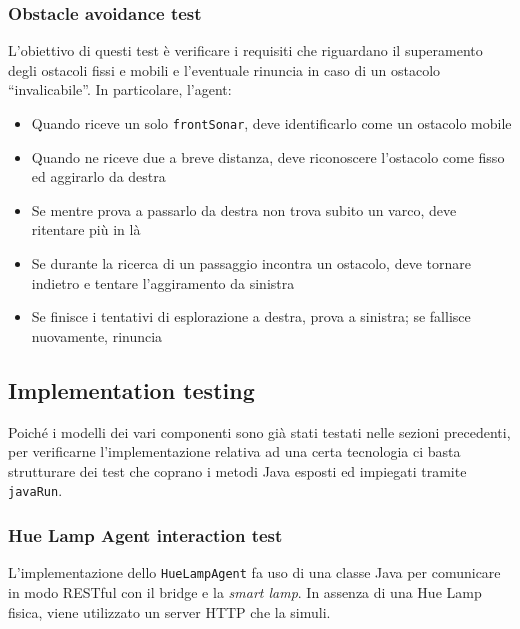 \documentclass{../llncs}
\newcommand{\codescript}[1]{{\mbox{\small{\texttt{#1}}}}\xspace}
\begin{document}
\subsubsection{Obstacle avoidance test}
L'obiettivo di questi test è verificare i requisiti che riguardano il superamento degli ostacoli fissi e mobili e l'eventuale rinuncia in caso di un ostacolo ``invalicabile''. In particolare, l'agent:
\begin{itemize}
\item Quando riceve un solo \codescript{frontSonar}, deve identificarlo come un ostacolo mobile
\item Quando ne riceve due a breve distanza, deve riconoscere l'ostacolo come fisso ed aggirarlo da destra
\item Se mentre prova a passarlo da destra non trova subito un varco, deve ritentare più in là
\item Se durante la ricerca di un passaggio incontra un ostacolo, deve tornare indietro e tentare l'aggiramento da sinistra
\item Se finisce i tentativi di esplorazione a destra, prova a sinistra; se fallisce nuovamente, rinuncia
\end{itemize}



\subsection{Implementation testing}
Poiché i modelli dei vari componenti sono già stati testati nelle sezioni precedenti, per verificarne l'implementazione relativa ad una certa tecnologia ci basta strutturare dei test che coprano i metodi Java esposti ed impiegati tramite \codescript{javaRun}.

\subsubsection{Hue Lamp Agent interaction test}
L'implementazione dello \texttt{HueLampAgent} fa uso di una classe Java per comunicare in modo RESTful con il bridge e la \textit{smart lamp}. In assenza di una Hue Lamp fisica, viene utilizzato un server HTTP che la simuli.\\


\end{document}
